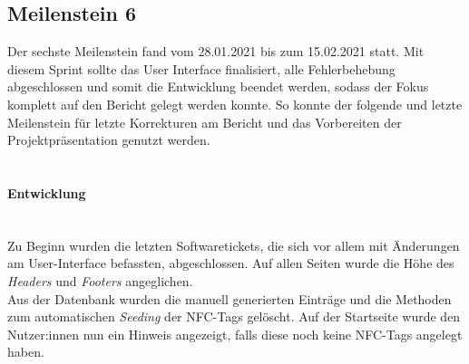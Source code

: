 \documentclass[10pt, a4paper]{article}
\begin{document}
\begin{onehalfspace}
\subsection{Meilenstein 6}
Der sechste Meilenstein fand vom 28.01.2021 bis zum 15.02.2021 statt.
Mit diesem Sprint sollte das User Interface finalisiert, alle Fehlerbehebung abgeschlossen und somit die Entwicklung beendet werden, sodass der Fokus komplett auf den Bericht gelegt werden konnte.
So konnte der folgende und letzte Meilenstein für letzte Korrekturen am Bericht und das Vorbereiten der Projektpräsentation genutzt werden.
\\~\\
\paragraph*{Entwicklung} $~$ \\
Zu Beginn wurden die letzten Softwaretickets, die sich vor allem mit Änderungen am User-Interface befassten, abgeschlossen.
Auf allen Seiten wurde die Höhe des \textit{Headers} und \textit{Footers} angeglichen. \\
Aus der Datenbank wurden die manuell generierten Einträge und die Methoden zum automatischen \textit{Seeding} der NFC-Tags gelöscht.
Auf der Startseite wurde den Nutzer:innen nun ein Hinweis angezeigt, falls diese noch keine NFC-Tags angelegt haben.


\end{onehalfspace}
\end{document}
